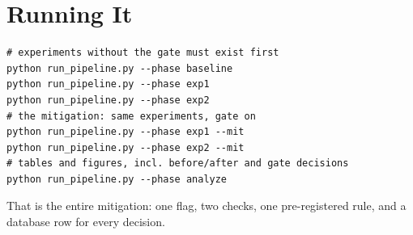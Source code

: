 \documentclass[11pt,a4paper]{article}
\begin{document}
\section{Running It}

\begin{verbatim}
# experiments without the gate must exist first
python run_pipeline.py --phase baseline
python run_pipeline.py --phase exp1
python run_pipeline.py --phase exp2
# the mitigation: same experiments, gate on
python run_pipeline.py --phase exp1 --mit
python run_pipeline.py --phase exp2 --mit
# tables and figures, incl. before/after and gate decisions
python run_pipeline.py --phase analyze
\end{verbatim}

\noindent That is the entire mitigation: one flag, two checks, one
pre-registered rule, and a database row for every decision.
\end{document}

